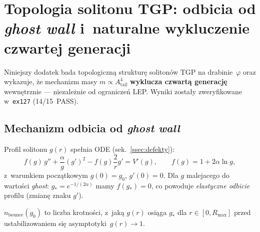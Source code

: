 \section{Topologia solitonu TGP: odbicia od \emph{ghost wall}
  i~naturalne wykluczenie czwartej genera\-cji}%
\label{app:T4-bounce}

Niniejszy dodatek bada topologiczn\k{a} struktur\k{e} soliton\'ow TGP
na drabinie~$\varphi$ oraz wykazuje, \.ze mechanizm masy $m \propto
A_{\mathrm{tail}}^4$ \textbf{wyklucza czwart\k{a} genera\-cj\k{e}}
wewn\k{e}trznie --- niezale\.znie od ogranicze\'n LEP.
Wyniki zosta\l{}y zweryfikowane w~\texttt{ex127} (14/15~PASS).

\medskip
\noindent{}
\medskip

\subsection{Mechanizm odbicia od \emph{ghost wall}}
\label{app:T4-bounce-mechanism}

Profil solitonu $g(r)$ spe\l{}nia ODE (sek.~\ref{ssec:defekty}):
\[
  f(g)\,g'' + \frac{\alpha}{g}(g')^2 - f(g)\frac{2}{r}g' = V'(g),
  \qquad
  f(g) = 1 + 2\alpha\ln g,
\]
z~warunkiem pocz\k{a}tkowym $g(0) = g_0$, $g'(0)=0$.
Dla $g$ malejacego do warto\'sci \emph{ghost}: $g_* = e^{-1/(2\alpha)}$
mamy $f(g_*) = 0$, co powoduje \emph{elastyczne odbicie} profilu
(zmian\k{e} znaku $g'$).

\begin{definition}%
\label{def:T4-nbounce}
$n_{\mathrm{bounce}}(g_0)$ to liczba krotno\'sci,
z~jak\k{a} $g(r)$ osi\k{a}ga $g_*$ dla $r \in [0, R_{\max}]$
przed ustabilizowaniem si\k{e} asymptotyki~$g(r) \to 1$.
\end{definition}


